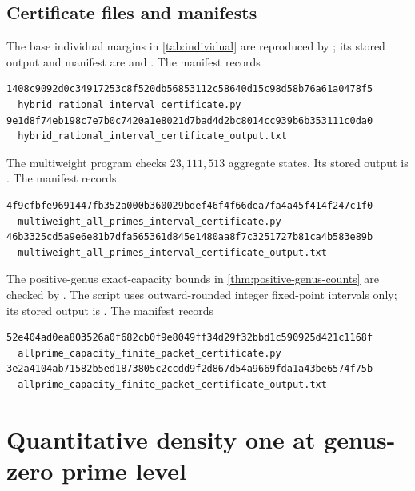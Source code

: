 \documentclass[11pt]{article}
\theoremstyle{definition}
\theoremstyle{remark}
\begin{document}
\subsection{Certificate files and manifests}\label{sec:certificate-files}

The base individual margins in \cref{tab:individual} are reproduced by
; its stored output and manifest
are  and
.  The manifest records
\begin{verbatim}
1408c9092d0c34917253c8f520db56853112c58640d15c98d58b76a61a0478f5
  hybrid_rational_interval_certificate.py
9e1d8f74eb198c7e7b0c7420a1e8021d7bad4d2bc8014cc939b6b353111c0da0
  hybrid_rational_interval_certificate_output.txt
\end{verbatim}

The multiweight program
 checks
$23{,}111{,}513$ aggregate states.  Its stored output is
.  The manifest
 records
\begin{verbatim}
4f9cfbfe9691447fb352a000b360029bdef46f4f66dea7fa4a45f414f247c1f0
  multiweight_all_primes_interval_certificate.py
46b3325cd5a9e6e81b7dfa565361d845e1480aa8f7c3251727b81ca4b583e89b
  multiweight_all_primes_interval_certificate_output.txt
\end{verbatim}


The positive-genus exact-capacity bounds in
\cref{thm:positive-genus-counts} are checked by
.  The script uses
outward-rounded integer fixed-point intervals only; its stored output is
.  The manifest
 records
\begin{verbatim}
52e404ad0ea803526a0f682cb0f9e8049ff34d29f32bbd1c590925d421c1168f
  allprime_capacity_finite_packet_certificate.py
3e2a4104ab71582b5ed1873805c2ccdd9f2d867d54a9669fda1a43be6574f75b
  allprime_capacity_finite_packet_certificate_output.txt
\end{verbatim}

\section{Quantitative density one at genus-zero prime level}\label{sec:density}
\end{document}
